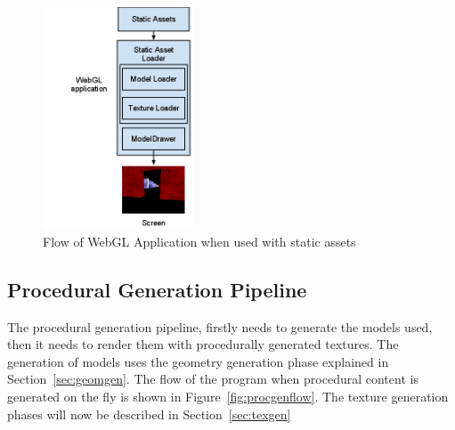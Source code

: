 






\begin{figure}
  \centering
  \includegraphics[width=0.4\textwidth]{images/gwtprocstaticassetpipeline}
  \caption{Flow of WebGL Application when used with static assets}
  \label{fig:staticasset}
\end{figure}

\subsection{Procedural Generation Pipeline}
\label{sec:procgen}
The procedural generation pipeline, firstly needs to generate the models used, then it needs to render them with procedurally generated textures.
The generation of models uses the geometry generation phase explained in Section~\ref{sec:geomgen}.
The flow of the program when procedural content is generated on the fly is shown in Figure~\ref{fig:procgenflow}.
The texture generation phases will now be described in Section~\ref{sec:texgen}

